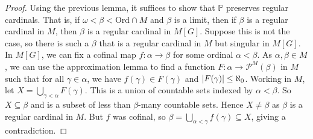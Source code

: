 \begin{proof}
    Using the previous lemma, it suffices to show that \( \mathbb P \) preserves regular cardinals.
    That is, if \( \omega < \beta < \mathrm{Ord} \cap M \) and \( \beta \) is a limit, then if \( \beta \) is a regular cardinal in \( M \), then \( \beta \) is a regular cardinal in \( M[G] \).
    Suppose this is not the case, so there is such a \( \beta \) that is a regular cardinal in \( M \) but singular in \( M[G] \).
    In \( M[G] \), we can fix a cofinal map \( f : \alpha \to \beta \) for some ordinal \( \alpha < \beta \).
    As \( \alpha, \beta \in M \), we can use the approximation lemma to find a function \( F : \alpha \to \mathcal P^M(\beta) \) in \( M \) such that for all \( \gamma \in \alpha \), we have \( f(\gamma) \in F(\gamma) \) and \( \abs{F(\gamma)} \leq \aleph_0 \).
    Working in \( M \), let \( X = \bigcup_{\gamma < \alpha} F(\gamma) \).
    This is a union of countable sets indexed by \( \alpha < \beta \).
    So \( X \subseteq \beta \) and is a subset of less than \( \beta \)-many countable sets.
    Hence \( X \neq \beta \) as \( \beta \) is a regular cardinal in \( M \).
    But \( f \) was cofinal, so \( \beta = \bigcup_{\alpha < \gamma} f(\gamma) \subseteq X \), giving a contradiction.
\end{proof}

